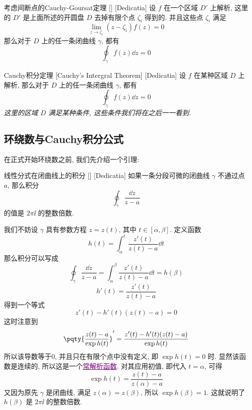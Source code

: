 \documentclass[UTF8]{ctexart}
\newcommand{\hyperrefc}[2]{\hyperref[#1]{\textcolor{purple}{#2}}}
\begin{document}
        \begin{thm}
            [UUID]
            {考虑间断点的Cauchy-Goursat定理}
            []
            [Dedicatia]
            设 \(f\) 在一个区域 \(D'\) 上解析, 这里的 \(D'\) 是上面所述的开圆盘 \(D\) 去掉有限个点 \(\zeta_i\) 得到的. 并且这些点 \(\zeta_i\) 满足
            \[\lim_{z\to\zeta_i }(z-\zeta_i)f(z)=0\]
            那么对于 \(D\) 上的任一条闭曲线 \(\gamma\), 都有
            \[\oint_\gamma f(z)\dd{z}=0\]
        \end{thm}
        
        \begin{thm}
            [Cauchy]
            {Cauchy积分定理}
            [Cauchy's Intergral Theorem]
            [Dedicatia]
            设 \(f\) 在某种区域 \(D\) 上解析, 那么对于 \(D\) 上的任一条闭曲线 \(\gamma\), 都有
            \[\oint_\gamma f(z)\dd{z}=0\]
            \textit{这里的区域 \(D\) 满足某种条件, 这些条件我们将在之后一一看到. }
        \end{thm}

    \subsection{环绕数与Cauchy积分公式}

        在正式开始环绕数之前, 我们先介绍一个引理:

        \begin{lma}
            [UUID]
            {线性分式在闭曲线上的积分}
            []
            [Dedicatia]
            如果一条分段可微的闭曲线 \(\gamma\) 不通过点 \(a\), 那么积分
            \[\oint_\gamma\frac{\dd{z}}{z-a} \]
            的值是 \(2\pi\ii\) 的整数倍数. 
        \end{lma}

        \begin{prf}
            我们不妨设 \(\gamma\) 具有参数方程 \(z=z(t)\), 其中 \(t\in[\alpha,\beta]\). 定义函数
            \[h(t)=\int_\alpha^t \frac{z'(t)}{z(t)-a}\dd{t}\]
            那么积分可以写成
            \[\oint_\gamma\frac{\dd{z}}{z-a}=\int_\alpha^\beta \frac{z'(t)}{z(t)-a}\dd{t}=h(\beta)\]
            \[h'(t)=\frac{z'(t)}{z(t)-a}\]
            得到一个等式
            \[z'(t)-h'(t)(z(t)-a)=0\]
            这时注意到
            \[\pqty{\frac{z(t)-a}{\exp h(t)}}'=\frac{z'(t)-h'(t)(z(t)-a)}{\exp h(t)}\]
            所以该导数等于0, 并且只在有限个点中没有定义, 即 \(\exp h(t)=0\) 时. 显然该函数是连续的, 所以这是一个\hyperrefc{ppt:TrivialAnalyticalFunction}{常解析函数}. 对其应用初值, 即代入 \(t=\alpha\), 可得
            \[\exp h(t)=\frac{z(t)-a}{z(\alpha)-a}\]
            又因为原先 \(\gamma\) 是闭曲线, 满足 \(z(\alpha)=z(\beta)\), 所以 \(\exp h(\beta)=1\). 这就说明了 \(h(\beta)\) 是 \(2\pi\ii\) 的整数倍数. 
        \end{prf}
\end{document}
